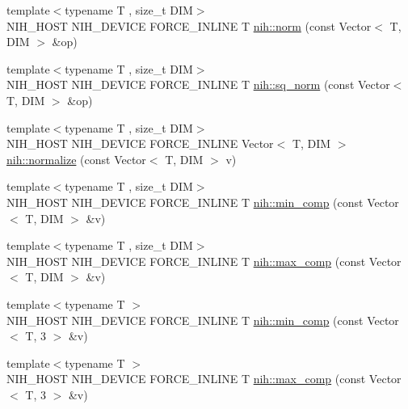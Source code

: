 \begin{DoxyCompactItemize}
\item 
{\footnotesize template$<$typename T , size\-\_\-t \-D\-I\-M$>$ }\\\-N\-I\-H\-\_\-\-H\-O\-S\-T \-N\-I\-H\-\_\-\-D\-E\-V\-I\-C\-E \-F\-O\-R\-C\-E\-\_\-\-I\-N\-L\-I\-N\-E \-T \hyperlink{group__linalg_gaef3221bb95a71d1743f7df1673082cbf}{nih\-::norm} (const \-Vector$<$ \-T, \-D\-I\-M $>$ \&op)
\item 
{\footnotesize template$<$typename T , size\-\_\-t \-D\-I\-M$>$ }\\\-N\-I\-H\-\_\-\-H\-O\-S\-T \-N\-I\-H\-\_\-\-D\-E\-V\-I\-C\-E \-F\-O\-R\-C\-E\-\_\-\-I\-N\-L\-I\-N\-E \-T \hyperlink{group__linalg_ga9c4ac20ce07631b820678349b4c46698}{nih\-::sq\-\_\-norm} (const \-Vector$<$ \-T, \-D\-I\-M $>$ \&op)
\item 
{\footnotesize template$<$typename T , size\-\_\-t \-D\-I\-M$>$ }\\\-N\-I\-H\-\_\-\-H\-O\-S\-T \-N\-I\-H\-\_\-\-D\-E\-V\-I\-C\-E \*
\-F\-O\-R\-C\-E\-\_\-\-I\-N\-L\-I\-N\-E \-Vector$<$ \-T, \-D\-I\-M $>$ \hyperlink{group__linalg_gae244399ef06f44b09f0a908aa406c037}{nih\-::normalize} (const \-Vector$<$ \-T, \-D\-I\-M $>$ v)
\item 
{\footnotesize template$<$typename T , size\-\_\-t \-D\-I\-M$>$ }\\\-N\-I\-H\-\_\-\-H\-O\-S\-T \-N\-I\-H\-\_\-\-D\-E\-V\-I\-C\-E \-F\-O\-R\-C\-E\-\_\-\-I\-N\-L\-I\-N\-E \-T \hyperlink{group__linalg_ga643f06fe0c1d7d9d1ae9fe81e61c389e}{nih\-::min\-\_\-comp} (const \-Vector$<$ \-T, \-D\-I\-M $>$ \&v)
\item 
{\footnotesize template$<$typename T , size\-\_\-t \-D\-I\-M$>$ }\\\-N\-I\-H\-\_\-\-H\-O\-S\-T \-N\-I\-H\-\_\-\-D\-E\-V\-I\-C\-E \-F\-O\-R\-C\-E\-\_\-\-I\-N\-L\-I\-N\-E \-T \hyperlink{group__linalg_gab4b34a60142a60bb290dfba1709c85f4}{nih\-::max\-\_\-comp} (const \-Vector$<$ \-T, \-D\-I\-M $>$ \&v)
\item 
{\footnotesize template$<$typename T $>$ }\\\-N\-I\-H\-\_\-\-H\-O\-S\-T \-N\-I\-H\-\_\-\-D\-E\-V\-I\-C\-E \-F\-O\-R\-C\-E\-\_\-\-I\-N\-L\-I\-N\-E \-T \hyperlink{group__linalg_ga0d2289c0f68f0b9f497a1e4bc62399e0}{nih\-::min\-\_\-comp} (const \-Vector$<$ \-T, 3 $>$ \&v)
\item 
{\footnotesize template$<$typename T $>$ }\\\-N\-I\-H\-\_\-\-H\-O\-S\-T \-N\-I\-H\-\_\-\-D\-E\-V\-I\-C\-E \-F\-O\-R\-C\-E\-\_\-\-I\-N\-L\-I\-N\-E \-T \hyperlink{group__linalg_gafccc66f85211e07bb1abee7f8fc0a281}{nih\-::max\-\_\-comp} (const \-Vector$<$ \-T, 3 $>$ \&v)

\end{DoxyCompactItemize}
